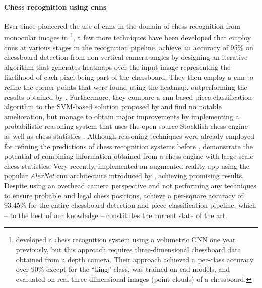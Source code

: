 \paragraph{Chess recognition using \glspl{cnn}}
Ever since \citeauthor{xie2018} pioneered the use of \glspl{cnn} in the domain of chess recognition from monocular images in \citeyear{xie2018}%
\footnote{%
    \textcite{wei2017} developed a chess recognition system using a volumetric CNN one year previously, but this approach requires three-dimensional chessboard data obtained from a depth camera. 
    Their approach achieved a per-class accuracy over 90\% except for the ``king'' class, was trained on \gls{cad} models, and evaluated on real three-dimensional images (point clouds) of a chessboard.
},
a few more techniques have been developed that employ \glspl{cnn} at various stages in the recognition pipeline.
\textcite{czyzewski2020} achieve an accuracy of 95\% on chessboard detection from non-vertical camera angles by designing an iterative algorithm that generates heatmaps over the input image representing the likelihood of each pixel being part of the chessboard. 
They then employ a \gls{cnn} to refine the corner points that were found using the heatmap, outperforming the results obtained by \textcite{goncalves2005}.
Furthermore, they compare a \gls{cnn}-based piece classification algorithm to the SVM-based solution proposed by \textcite{ding2016} and find no notable amelioration, but manage to obtain major improvements by implementing a probabilistic reasoning system that uses the open source Stockfish chess engine \cite{romstad2020} as well as chess statistics \cite{acher2016}.
Although reasoning techniques were already employed for refining the predictions of chess recognition systems before \cite{neufeld2010,danner2015}, \citeauthor{czyzewski2020} demonstrate the potential of combining information obtained from a chess engine with large-scale chess statistics.  
Very recently, \textcite{mehta2020} implemented an augmented reality app using the popular \emph{AlexNet} \gls{cnn} architecture introduced by \textcite{krizhevsky2017}, achieving promising results.
Despite using an overhead camera perspective and not performing any techniques to ensure probable and legal chess positions, \citeauthor{mehta2020} achieve a per-square accuracy of 93.45\% for the entire chessboard detection and piece classification pipeline, which -- to the best of our knowledge -- constitutes the current state of the art.

